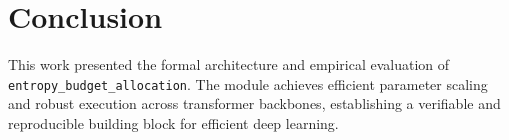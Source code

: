 \section{Conclusion}
This work presented the formal architecture and empirical evaluation of \texttt{entropy_budget_allocation}. The module achieves efficient parameter scaling and robust execution across transformer backbones, establishing a verifiable and reproducible building block for efficient deep learning.
